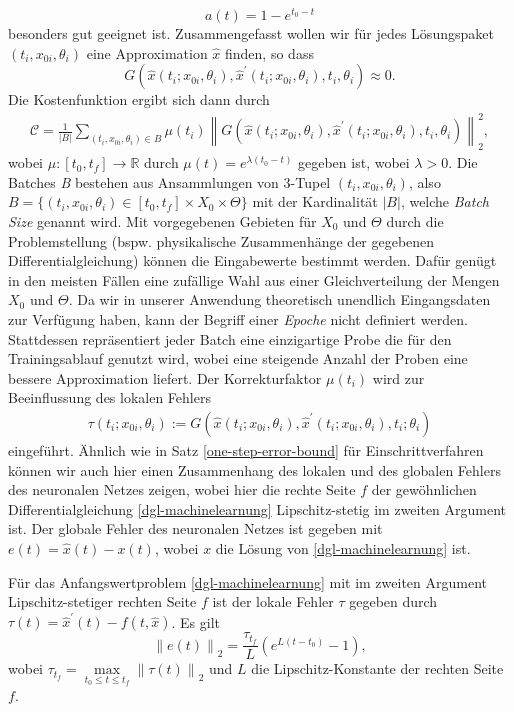 \[
    a(t) = 1 - e^{t_0-t}
\]
besonders gut geeignet ist. Zusammengefasst wollen wir für jedes Lösungspaket $(t_i,x_{0i}, \theta_i)$ eine Approximation
$\hat{x}$ finden, so dass
\[
    G(\hat{x}(t_i;x_{0i},\theta_i), \hat{x}^{\prime}(t_i;x_{0i},\theta_i),t_i,\theta_i) \approx 0.
\]
Die Kostenfunktion ergibt sich dann durch
\begin{align}
    \label{cost-func}
    \mathcal{C} = \frac{1}{|B|} \sum_{(t_i,x_{0i},\theta_i) \in B} \mu(t_i)
    \left\lVert G(\hat{x}(t_i;x_{0i},\theta_i), \hat{x}^{\prime}(t_i;x_{0i},\theta_i),t_i,\theta_i) \right\rVert_2^2,
\end{align}
wobei $\mu:[t_0,t_f] \rightarrow \mathbb{R}$ durch $\mu(t) = e^{\lambda (t_0 - t)}$ gegeben ist, wobei $\lambda>0$. Die Batches
\textit{B} bestehen aus Ansammlungen von 3-Tupel $(t_i,x_{0i},\theta_i)$, also
$B=\{(t_i,x_{0i},\theta_i) \in [t_0,t_f] \times X_0 \times \Theta\}$ mit der Kardinalität $|B|$, welche \textit{Batch Size} genannt wird. Mit
vorgegebenen Gebieten für $X_0$ und $\Theta$ durch die Problemstellung (bspw. physikalische Zusammenhänge der gegebenen
Differentialgleichung) können die Eingabewerte bestimmt werden. Dafür genügt in den meisten Fällen eine zufällige
Wahl aus einer Gleichverteilung der Mengen $X_0$ und $\Theta$. Da wir in unserer Anwendung theoretisch unendlich
Eingangsdaten zur Verfügung haben, kann der Begriff einer \textit{Epoche} nicht definiert werden. Stattdessen
repräsentiert jeder Batch eine einzigartige Probe die für den Trainingsablauf genutzt wird, wobei eine steigende
Anzahl der Proben eine bessere Approximation liefert. Der Korrekturfaktor $\mu(t_i)$ wird zur Beeinflussung des lokalen
Fehlers
\begin{align*}
    \tau(t_i;x_{0i}, \theta_i)
    := G \left( \hat{x}(t_i;x_{0i}, \theta_i), \hat{x}^{\prime}(t_i;x_{0i}, \theta_i),t_i;\theta_i \right)
\end{align*}
eingeführt. Ähnlich wie in Satz \ref{one-step-error-bound} für Einschrittverfahren können wir auch hier einen
Zusammenhang des lokalen und des globalen Fehlers des neuronalen Netzes zeigen, wobei hier die rechte Seite $f$ der
gewöhnlichen Differentialgleichung \eqref{dgl-machinelearnung} Lipschitz-stetig im zweiten Argument ist. Der globale
Fehler des neuronalen Netzes ist gegeben mit $e(t) = \hat{x}(t) - x(t)$, wobei $x$ die Lösung von
\eqref{dgl-machinelearnung} ist.
\begin{satz}
    \label{ml-error}
    Für das Anfangswertproblem \eqref{dgl-machinelearnung} mit im zweiten Argument Lipschitz-stetiger rechten Seite $f$
    ist der lokale Fehler $\tau$ gegeben durch $\tau(t) = \hat{x}^{\prime}(t) - f(t,\hat{x})$. Es gilt
    \[
        \left\lVert e(t) \right\rVert_2 = \frac{\tau_{t_f}}{L} \left( e^{L(t-t_0)} - 1 \right),
    \]
    wobei $\tau_{t_f} = \max\limits_{t_0 \leq t \leq t_f} \left\lVert \tau(t) \right\rVert_2$ und $L$ die
    Lipschitz-Konstante der rechten Seite $f$.
\end{satz}
